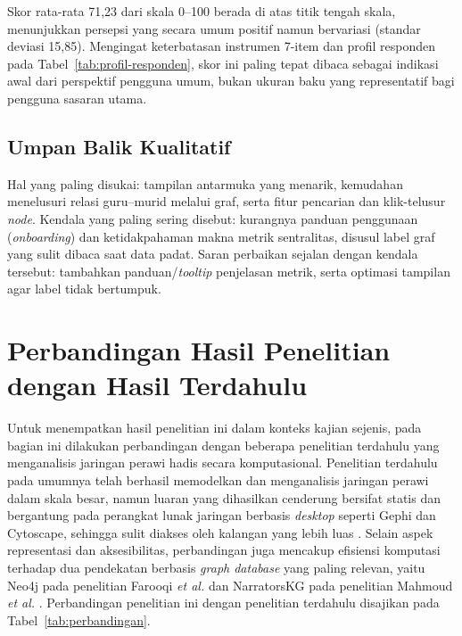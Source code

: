 Skor rata-rata 71,23 dari skala 0--100 berada di atas titik tengah skala, menunjukkan persepsi yang secara umum positif namun bervariasi (standar deviasi 15,85). Mengingat keterbatasan instrumen 7-item dan profil responden pada Tabel~\ref{tab:profil-responden}, skor ini paling tepat dibaca sebagai indikasi awal dari perspektif pengguna umum, bukan ukuran baku yang representatif bagi pengguna sasaran utama.

\subsection{Umpan Balik Kualitatif}
Hal yang paling disukai: tampilan antarmuka yang menarik, kemudahan menelusuri relasi guru--murid melalui graf, serta fitur pencarian dan klik-telusur \textit{node}. Kendala yang paling sering disebut: kurangnya panduan penggunaan (\textit{onboarding}) dan ketidakpahaman makna metrik sentralitas, disusul label graf yang sulit dibaca saat data padat. Saran perbaikan sejalan dengan kendala tersebut: tambahkan panduan/\textit{tooltip} penjelasan metrik, serta optimasi tampilan agar label tidak bertumpuk.

\section{Perbandingan Hasil Penelitian dengan Hasil Terdahulu}
\label{sec:perbandingan-terdahulu}
Untuk menempatkan hasil penelitian ini dalam konteks kajian sejenis, pada bagian ini dilakukan perbandingan dengan beberapa penelitian terdahulu yang menganalisis jaringan perawi hadis secara komputasional. Penelitian terdahulu pada umumnya telah berhasil memodelkan dan menganalisis jaringan perawi dalam skala besar, namun luaran yang dihasilkan cenderung bersifat statis dan bergantung pada perangkat lunak jaringan berbasis \textit{desktop} seperti Gephi dan Cytoscape, sehingga sulit diakses oleh kalangan yang lebih luas \cite{FAROOQI2024110439, Shuaib2022}. Selain aspek representasi dan aksesibilitas, perbandingan juga mencakup efisiensi komputasi terhadap dua pendekatan berbasis \textit{graph database} yang paling relevan, yaitu Neo4j pada penelitian Farooqi \textit{et al.} \cite{FAROOQI2024110439} dan NarratorsKG pada penelitian Mahmoud \textit{et al.} \cite{Mahmoud2024}. Perbandingan penelitian ini dengan penelitian terdahulu disajikan pada Tabel~\ref{tab:perbandingan}.

